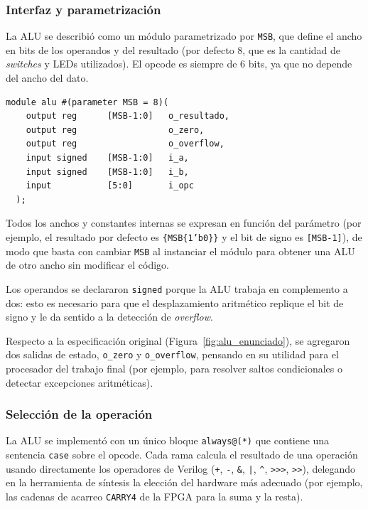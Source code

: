 \subsubsection{Interfaz y parametrización}
La ALU se describió como un módulo parametrizado por \texttt{MSB}, que define el ancho en bits de los operandos y del resultado (por defecto 8, que es la cantidad de \textit{switches} y LEDs utilizados). El opcode es siempre de 6 bits, ya que no depende del ancho del dato.

\begin{lstlisting}[caption={Declaración de la interfaz de la ALU.}]
module alu #(parameter MSB = 8)(
    output reg      [MSB-1:0]   o_resultado,
    output reg                  o_zero,
    output reg                  o_overflow,
    input signed    [MSB-1:0]   i_a,
    input signed    [MSB-1:0]   i_b,
    input           [5:0]       i_opc
  );
\end{lstlisting}

Todos los anchos y constantes internas se expresan en función del parámetro (por ejemplo, el resultado por defecto es \texttt{\{MSB\{1'b0\}\}} y el bit de signo es \texttt{[MSB-1]}), de modo que basta con cambiar \texttt{MSB} al instanciar el módulo para obtener una ALU de otro ancho sin modificar el código.

Los operandos se declararon \texttt{signed} porque la ALU trabaja en complemento a dos: esto es necesario para que el desplazamiento aritmético replique el bit de signo y le da sentido a la detección de \textit{overflow}.

Respecto a la especificación original (Figura~\ref{fig:alu_enunciado}), se agregaron dos salidas de estado, \texttt{o\_zero} y \texttt{o\_overflow}, pensando en su utilidad para el procesador del trabajo final (por ejemplo, para resolver saltos condicionales o detectar excepciones aritméticas).

\subsubsection{Selección de la operación}
La ALU se implementó con un único bloque \texttt{always@(*)} que contiene una sentencia \texttt{case} sobre el opcode. Cada rama calcula el resultado de una operación usando directamente los operadores de Verilog (\texttt{+}, \texttt{-}, \texttt{\&}, \texttt{|}, \texttt{\^{}}, \texttt{>>>}, \texttt{>>}), delegando en la herramienta de síntesis la elección del hardware más adecuado (por ejemplo, las cadenas de acarreo \texttt{CARRY4} de la FPGA para la suma y la resta).

